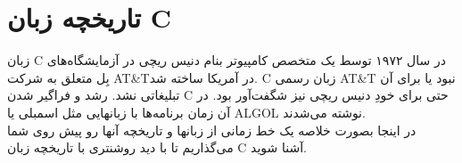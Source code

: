 \chapter{تاریخچه زبان C}
زبان C در سال ۱۹۷۲ توسط یک متخصص کامپیوتر بنام دنیس ریچی در آزمایشگاه‌های بِل متعلق به شرکت AT\&Tدر آمریکا ساخته شد. C زبان رسمی AT\&T نبود یا برای آن تبلیغاتی نشد. رشد و فراگیر شدن C حتی برای خودِ دنیس ریچی نیز شگفت‌آور بود. در آن زمان برنامه‌ها با زبانهایی مثل اسمبلی یا ALGOL نوشته می‌شدند. \\
در اینجا بصورت خلاصه یک خط زمانی از زبانها و تاریخچه آنها رو پیش روی شما می‌گذاریم تا با دید روشنتری با تاریخچه زبان C آشنا شوید.